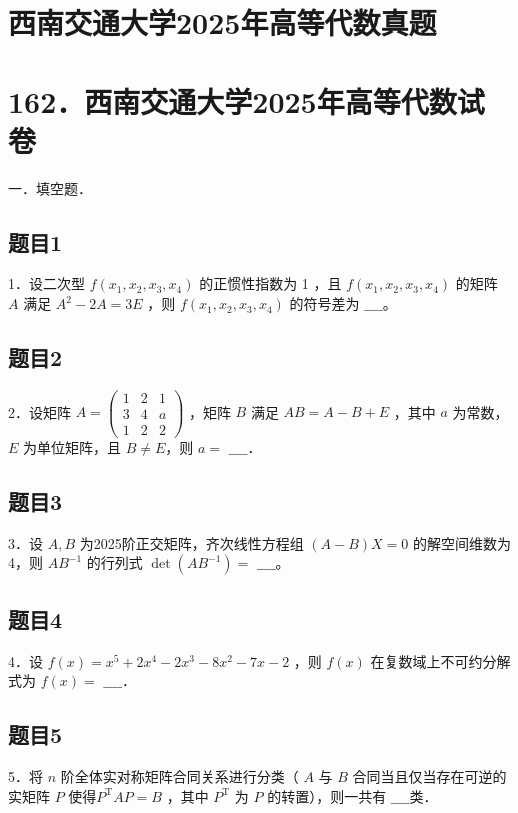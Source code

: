 \documentclass{article}
\begin{document}
\section*{西南交通大学2025年高等代数真题}
\section*{162．西南交通大学2025年高等代数试卷}

一．填空题．

\subsection{题目1}
1．设二次型 \(f\left(x_{1}, x_{2}, x_{3}, x_{4}\right)\) 的正惯性指数为 1 ，且 \(f\left(x_{1}, x_{2}, x_{3}, x_{4}\right)\) 的矩阵 \(A\) 满足 \(A^{2}-2 A=3 E\) ，则 \(f\left(x_{1}, x_{2}, x_{3}, x_{4}\right)\) 的符号差为 \(\_\_\_\_\)。

\subsection{题目2}
2．设矩阵 \(A=\left(\begin{array}{lll}1 & 2 & 1 \\ 3 & 4 & a \\ 1 & 2 & 2\end{array}\right)\) ，矩阵 \(B\) 满足 \(A B=A-B+E\) ，其中 \(a\) 为常数，\(E\) 为单位矩阵，且 \(B \neq E\)，则 \(a=\) \(\_\_\_\_\)．

\subsection{题目3}
3．设 \(A, B\) 为2025阶正交矩阵，齐次线性方程组 \((A-B) X=0\) 的解空间维数为4，则 \(A B^{-1}\) 的行列式 \(\operatorname{det}\left(A B^{-1}\right)=\) \(\_\_\_\_\)。

\subsection{题目4}
4．设 \(f(x)=x^{5}+2 x^{4}-2 x^{3}-8 x^{2}-7 x-2\) ，则 \(f(x)\) 在复数域上不可约分解式为 \(f(x)=\) \(\_\_\_\_\)．

\subsection{题目5}
5．将 \(n\) 阶全体实对称矩阵合同关系进行分类（ \(A\) 与 \(B\) 合同当且仅当存在可逆的实矩阵 \(P\) 使得\(P^{\mathrm{T}} A P=B\) ，其中 \(P^{\mathrm{T}}\) 为 \(P\) 的转置），则一共有 \(\_\_\_\_\)类．
\end{document}
